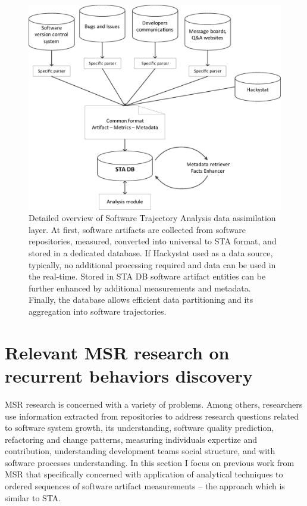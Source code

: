 \begin{figure}[t]
   \centering
   \vspace{1cm}
   \includegraphics[width=115mm]{figures/Flow.eps}
   \caption{Detailed overview of Software Trajectory Analysis data assimilation layer. 
    At first, software artifacts are collected from software repositories, measured, converted into 
    universal to STA format, and stored in a dedicated database.
    If Hackystat used as a data source, typically, no additional processing required and data can be used in the real-time.
    Stored in STA DB software artifact entities can be further enhanced by additional measurements and metadata.
    Finally, the database allows efficient data partitioning and its aggregation into software trajectories.}
   \label{fig:sta-assimilation}
\end{figure}

\section{Relevant MSR research on recurrent behaviors discovery}
MSR research is concerned with a variety of problems. Among others, researchers use information extracted from 
repositories to address research questions related to 
software system growth, 
its understanding,
software quality prediction,
refactoring and change patterns,
measuring individuals expertize and contribution,
understanding development teams social structure,
and with software processes understanding.
In this section I focus on previous work from MSR that specifically concerned with application of analytical techniques 
to ordered sequences of software artifact measurements -- the approach which is similar to STA.

